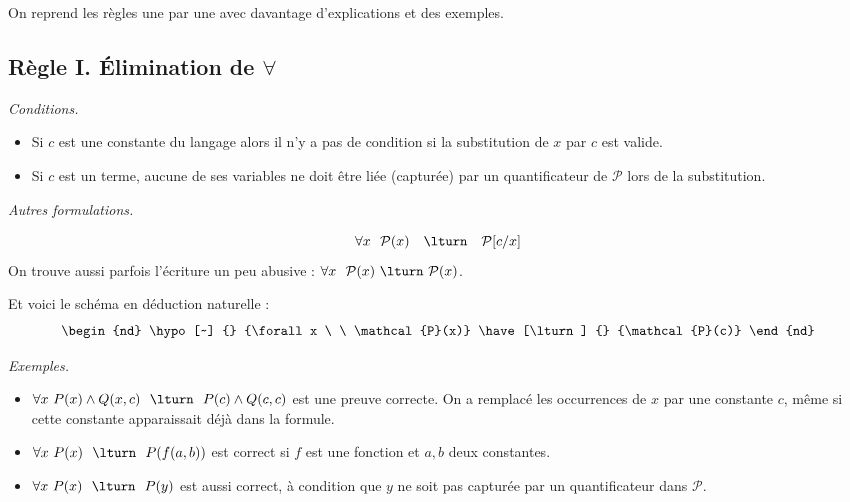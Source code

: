 \documentclass[11pt,class=report,crop=false]{standalone}
\begin{document}
On reprend les règles une par une avec davantage d'explications et des exemples.

\subsection{Règle I. Élimination de $\forall$}



\medskip

\emph{Conditions.} 
\begin{itemize}
	\item Si $c$ est une constante du langage alors il n'y a pas de condition si la substitution de $x$ par $c$ est valide.
	
	\item Si $c$ est un terme, aucune de ses variables ne doit être liée (capturée) par un quantificateur de $\mathcal{P}$ lors de la substitution.
\end{itemize}

\emph{Autres formulations.}

\[
\forall x \ \ \mathcal{P}(x)  \quad \lturn \quad  \mathcal{P}[c/x]
\]
On trouve aussi parfois l'écriture un peu abusive : $\forall x \ \ \mathcal{P}(x)  \ \lturn \  \mathcal{P}(x)$.

Et voici le schéma en déduction naturelle :
\[
\begin{nd}
	\hypo [~] {} {\forall x \ \ \mathcal{P}(x)}
	\have [\lturn] {} {\mathcal{P}(c)} 
\end{nd}
\]


\medskip

\emph{Exemples.} 
\begin{itemize}

	\item $\forall x \ P(x) \land Q(x,c) \ \ \lturn \ \  P(c) \land Q(c,c)$ est une preuve correcte. On a remplacé les occurrences de $x$ par une constante $c$, même si cette constante apparaissait déjà dans la formule.
	
	\item $\forall x \ P(x)  \ \ \lturn \ \ P( f(a,b) )$ est correct si $f$ est une fonction et $a, b$ deux constantes.
	
	\item $\forall x \ P(x)  \ \ \lturn \ \ P(y)$ est aussi correct, à condition que $y$ ne soit pas capturée par un quantificateur dans $\mathcal{P}$.
\end{itemize}
\end{document}
